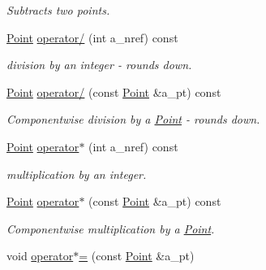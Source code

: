 \begin{DoxyCompactItemize}
\begin{DoxyCompactList}\small\item\em Subtracts two points. \end{DoxyCompactList}\item 
\hypertarget{classPoint_a59eae349066f8366ccf97c129c33d276}{}\hyperlink{classPoint}{Point} \hyperlink{classPoint_a59eae349066f8366ccf97c129c33d276}{operator/} (int a\+\_\+nref) const \label{classPoint_a59eae349066f8366ccf97c129c33d276}

\begin{DoxyCompactList}\small\item\em division by an integer -\/ rounds down. \end{DoxyCompactList}\item 
\hypertarget{classPoint_ad7644e8ecf6313d23605562788dfb995}{}\hyperlink{classPoint}{Point} \hyperlink{classPoint_ad7644e8ecf6313d23605562788dfb995}{operator/} (const \hyperlink{classPoint}{Point} \&a\+\_\+pt) const \label{classPoint_ad7644e8ecf6313d23605562788dfb995}

\begin{DoxyCompactList}\small\item\em Componentwise division by a \hyperlink{classPoint}{Point} -\/ rounds down. \end{DoxyCompactList}\item 
\hypertarget{classPoint_a4152c209ab56ba52931febfd97f87c3c}{}\hyperlink{classPoint}{Point} \hyperlink{classPoint_a4152c209ab56ba52931febfd97f87c3c}{operator$\ast$} (int a\+\_\+nref) const \label{classPoint_a4152c209ab56ba52931febfd97f87c3c}

\begin{DoxyCompactList}\small\item\em multiplication by an integer. \end{DoxyCompactList}\item 
\hypertarget{classPoint_acc7e19bbf8de57b34764727b671b839e}{}\hyperlink{classPoint}{Point} \hyperlink{classPoint_acc7e19bbf8de57b34764727b671b839e}{operator$\ast$} (const \hyperlink{classPoint}{Point} \&a\+\_\+pt) const \label{classPoint_acc7e19bbf8de57b34764727b671b839e}

\begin{DoxyCompactList}\small\item\em Componentwise multiplication by a \hyperlink{classPoint}{Point}. \end{DoxyCompactList}\item 
\hypertarget{classPoint_ab7db9ac762d6637efcce56afc7750f1f}{}void \hyperlink{classPoint_ab7db9ac762d6637efcce56afc7750f1f}{operator$\ast$=} (const \hyperlink{classPoint}{Point} \&a\+\_\+pt)\label{classPoint_ab7db9ac762d6637efcce56afc7750f1f}


\end{DoxyCompactItemize}
